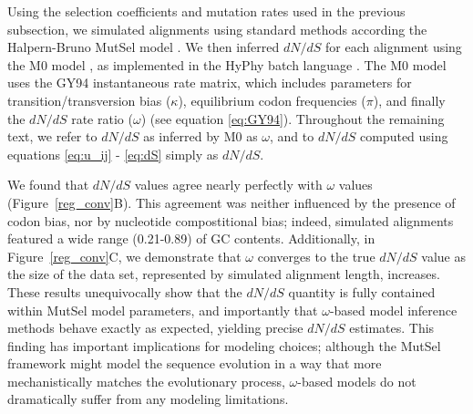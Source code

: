\documentclass{pnastwo}
\begin{document}
\begin{article}
Using the selection coefficients and mutation rates used in the previous subsection, we simulated alignments using standard methods \cite{Yang2006} according the Halpern-Bruno MutSel model \cite{HalpernBruno1998}. We then inferred $dN/dS$ for each alignment using the M0 model \cite{GoldmanYang1994,Yangetal2000}, as implemented in the HyPhy batch language \cite{KosakovskyPondetal2005}. The M0 model uses the GY94 instantaneous rate matrix, which includes parameters for transition/transversion bias ($\kappa$), equilibrium codon frequencies ($\pi$), and finally the $dN/dS$ rate ratio ($\omega$) (see equation \eqref{eq:GY94}). Throughout the remaining text, we refer to $dN/dS$ as inferred by M0 as $\omega$, and to $dN/dS$ computed using equations \eqref{eq:u_ij} - \eqref{eq:dS} simply as $dN/dS$. 


We found that $dN/dS$ values agree nearly perfectly with $\omega$ values (Figure~\ref{reg_conv}B). This agreement was neither influenced by the presence of codon bias, nor by nucleotide compostitional bias; indeed, simulated alignments featured a wide range (0.21-0.89) of GC contents. Additionally, in Figure~\ref{reg_conv}C, we demonstrate that $\omega$ converges to the true $dN/dS$ value as the size of the data set, represented by simulated alignment length, increases. These results unequivocally show that the $dN/dS$ quantity is fully contained within MutSel model parameters, and importantly that $\omega$-based model inference methods behave exactly as expected, yielding precise $dN/dS$ estimates. This finding has important implications for modeling choices; although the MutSel framework might model the sequence evolution in a way that more mechanistically matches the evolutionary process, $\omega$-based models do not dramatically suffer from any modeling limitations. 



\end{article}
\end{document}
